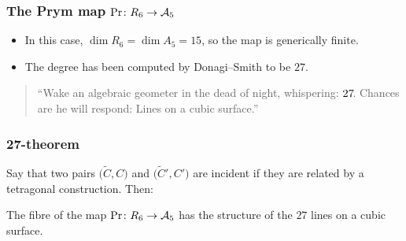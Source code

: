 \begin{frame}
\frametitle{The Prym map $\Pr \colon R_6 \to \mathcal{A}_5$}

\begin{itemize}
	\item In this case, $\dim R_6 = \dim A_5 = 15$, so the map is generically finite.
	\pause
	\item The degree has been computed by Donagi--Smith to be $27$.
\end{itemize}

\pause

\vfill
\begin{quote}
    \large
    ``Wake an algebraic geometer in the dead of night, \phantom{``}whispering: $27\mkern-3mu$. Chances are he will respond: Lines on a \phantom{``}cubic surface.''
\end{quote}
\vfill

\end{frame}

\begin{frame}
\frametitle{27-theorem}

Say that two pairs $\Big(\widetilde C, C\Big)$ and $\Big(\widetilde C', C'\Big)$ are \alert{incident} if they are related by a tetragonal construction. Then:


\begin{theorem}
The fibre of the map $\Pr \colon R_6 \to \mathcal{A}_5$ has the structure of the $27$ lines on a cubic surface.
\end{theorem}

\end{frame}
